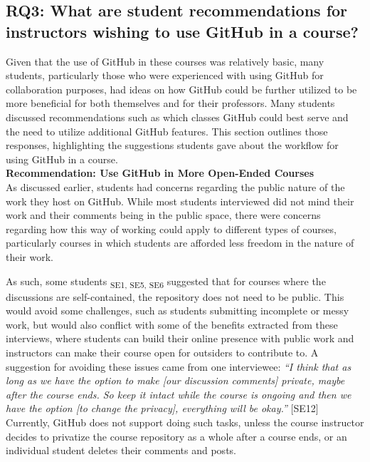 \subsection{RQ3: What are student recommendations for instructors wishing to use GitHub in a course?}

Given that the use of GitHub in these courses was relatively basic, many students, particularly those who were experienced with using GitHub for collaboration purposes, had ideas on how GitHub could be further utilized to be more beneficial for both themselves and for their professors. Many students discussed recommendations such as which classes GitHub could best serve and the need to utilize additional GitHub features. This section outlines those responses, highlighting the suggestions students gave about the workflow for using GitHub in a course. \\

\textbf{Recommendation: Use GitHub in More Open-Ended Courses} \\
As discussed earlier, students had concerns regarding the public nature of the work they host on GitHub. While most students interviewed did not mind their work and their comments being in the public space, there were concerns regarding how this way of working could apply to different types of courses, particularly courses in which students are afforded less freedom in the nature of their work. %

As such, some students \textsubscript{SE1, SE5, SE6} suggested that for courses where the discussions are self-contained, the repository does not need to be public. This would avoid some challenges, such as students submitting incomplete or messy work, but would also conflict with some of the benefits extracted from these interviews, where students can build their online presence with public work and instructors can make their course open for outsiders to contribute to. A suggestion for avoiding these issues came from one interviewee: \textit{``I think that as long as we have the option to make [our discussion comments] private, maybe after the course ends. So keep it intact while the course is ongoing and then we have the option [to change the privacy], everything will be okay.''} [SE12] Currently, GitHub does not support doing such tasks, unless the course instructor decides to privatize the course repository as a whole after a course ends, or an individual student deletes their comments and posts. %

